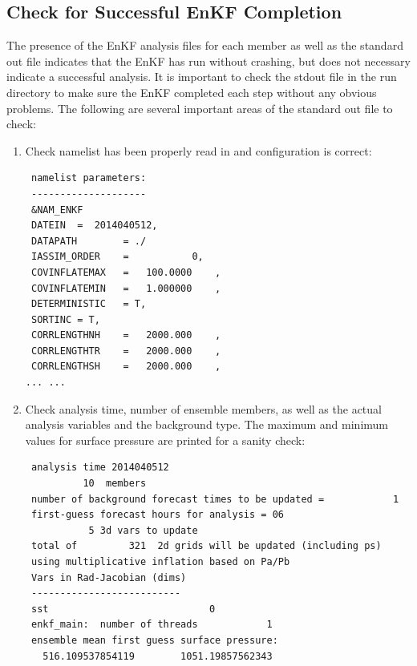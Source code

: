\subsection{Check for Successful EnKF Completion}

The presence of the EnKF analysis files for each member as well as the standard out file indicates that the EnKF has run without crashing, but does not necessary indicate a successful analysis. It is important to check the stdout file in the run directory to make sure the EnKF completed each step without any obvious problems. The following are several important areas of the standard out file to check:
\begin{enumerate}
\item Check namelist has been properly read in and configuration is correct:
\begin{footnotesize}
\begin{verbatim}
 namelist parameters:
 --------------------
 &NAM_ENKF
 DATEIN  =  2014040512,
 DATAPATH        = ./                                                                       
 IASSIM_ORDER    =           0,
 COVINFLATEMAX   =   100.0000    ,
 COVINFLATEMIN   =   1.000000    ,
 DETERMINISTIC   = T,
 SORTINC = T,
 CORRLENGTHNH    =   2000.000    ,
 CORRLENGTHTR    =   2000.000    ,
 CORRLENGTHSH    =   2000.000    ,
... ...
\end{verbatim}
\end{footnotesize}

\item Check analysis time, number of ensemble members, as well as the actual analysis variables and the background type. The maximum and minimum values for surface pressure are printed for a sanity check:
\begin{footnotesize}
\begin{verbatim}
 analysis time 2014040512
          10  members
 number of background forecast times to be updated =            1
 first-guess forecast hours for analysis = 06
           5 3d vars to update
 total of         321  2d grids will be updated (including ps)
 using multiplicative inflation based on Pa/Pb
 Vars in Rad-Jacobian (dims)
 --------------------------
 sst                            0
 enkf_main:  number of threads            1
 ensemble mean first guess surface pressure:
   516.109537854119        1051.19857562343
\end{verbatim}
\end{footnotesize}


\end{enumerate}
